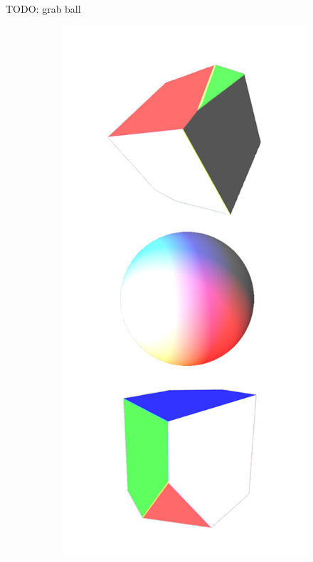 \documentclass{l4proj}
\begin{document}
TODO: grab ball

\begin{figure}[H]
  \begin{subfigure}[b]{0.32\textwidth}
    \includegraphics[width=\textwidth]{images/textures/no-pattern-rgbw.png}

\end{subfigure}
\end{figure}
\end{document}

